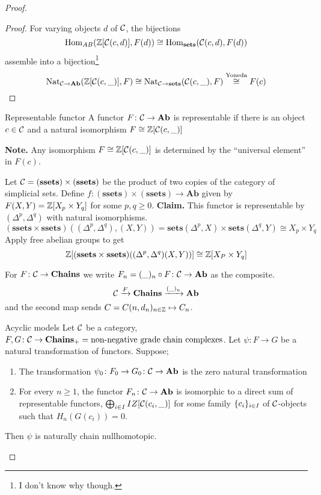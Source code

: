 \documentclass[language=english]{TemplateLecture}
\begin{document}
\begin{proof}
    \begin{proof}
        For varying objects \(d\) of \(\mathcal{C}\), the bijections
        \[\operatorname{Hom}_{AB}(\mathbb{Z}[\mathcal{C}(c,d)], F(d)) \cong \operatorname{Hom}_{\mathbf{sets}}(\mathcal{C}(c,d), F(d))\]
        assemble into a bijection\footnote{I don't know why though.}
        \[\mathrm{Nat}_{\mathcal{C} \to \mathbf{Ab}}(\mathbb{Z}[\mathcal{C}(c, \_)], F) \cong \mathrm{Nat}_{\mathcal{C} \to \mathbf{sets}}(\mathcal{C}(c, \_), F) \overset{\text{Yoneda}}{\cong} F(c)\]
    \end{proof}

    \begin{defi}{Representable functor}{}
        A functor \(F\colon \mathcal{C} \to \mathbf{Ab}\) is representable if there is an object \(c \in \mathcal{C}\) and a natural isomorphism \(F\cong \mathbb{Z}[\mathcal{C}(c,\_)]\)
    \end{defi}
    \textbf{Note.} Any isomorphism \(F \cong \mathbb{Z}[\mathcal{C}(c,\_)]\) is determined by the \enquote{universal element} in \(F(c)\).

    \begin{example}
        Let \(\mathcal{C} = (\mathbf{ssets}) \times (\mathbf{ssets})\) be the product of two copies of the category of simplicial sets. Define \(f\colon (\mathbf{ssets})\times (\mathbf{ssets}) \to \mathbf{Ab}\) given by \(F(X,Y) = \mathbb{Z}[X_p \times Y_q]\) for some \(p,q \geq 0\).
        \textbf{Claim.} This functor is representable by \((\Delta^p, \Delta^q)\) with natural isomorphisms.
        \[(\mathbf{ssets}\times \mathbf{ssets})((\Delta^p, \Delta^q), (X,Y)) = \mathbf{sets}(\Delta^p, X) \times \mathbf{sets}(\Delta^q,Y) \cong X_p \times Y_q\]
        Apply free abelian groups to get
        \[\mathbb{Z}[(\mathbf{ssets} \times \mathbf{ssets})((\Delta^p,\Delta^q)(X,Y))] \cong \mathbb{Z}[X_P \times Y_q]\]
    \end{example}

    \begin{notation}
        For \(F\colon \mathcal{C} \to \mathbf{Chains}\) we write \(F_n = (\_)_n \circ F\colon \mathcal{C} \to \mathbf{Ab}\) as the composite.
        \[\mathcal{C} \xrightarrow{F} \mathbf{Chains} \xrightarrow{(\_)_n} \mathbf{Ab}\]
        and the second map sends \(C = C(n, d_n)_{n \in \mathbb{Z}} \mapsto C_n\).
    \end{notation}

    \begin{thm}{Acyclic models}{}
        Let \(\mathcal{C}\) be a category, \(F,G\colon \mathcal{C} \to \mathbf{Chains}_+ = \text{non-negative grade chain complexes}\). Let \(\psi \colon F \to G\) be a natural transformation of functors. Suppose;
        \begin{enumerate}
            \item The transformation \(\psi_0 \colon F_0 \to G_0 \colon \mathcal{C} \to \mathbf{Ab}\) is the zero natural transformation
            \item For every \(n \geq 1\), the functor \(F_n \colon \mathcal{C} \to \mathbf{Ab}\) is isomorphic to a direct sum of representable functors, \(\bigoplus_{i \in I} IZ[\mathcal{C}(c_i,\_)]\) for some family \(\{c_i\}_{i \in I}\) of \(\mathcal{C}\)-objects such that \(H_n(G(c_i)) = 0\).
        \end{enumerate}
        Then \(\psi\) is naturally chain nullhomotopic.
    \end{thm}



\end{proof}
\end{document}
